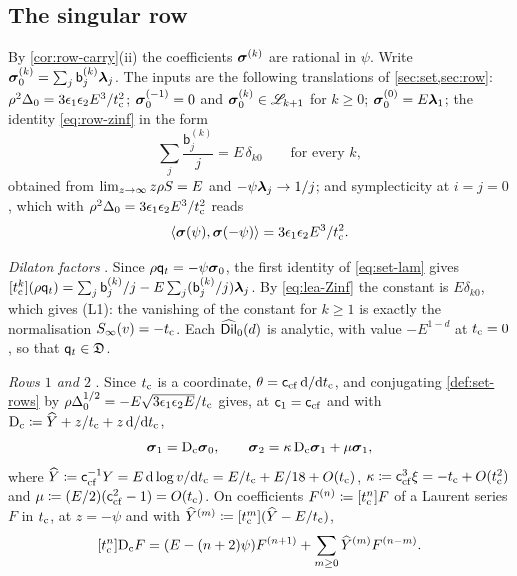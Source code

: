\subsection{The singular row}\label{sec:lea-row0}

By \cref{cor:row-carry}\textup{(ii)} the coefficients $\boldsymbol{\sigma}^{(k)}$ are rational in $\psi$. Write $\boldsymbol{\sigma}_0^{(k)}=\sum_j\mathsf{b}_j^{(k)}\boldsymbol{\lambda}_j$. The inputs are the following translations of \cref{sec:set,sec:row}: $\rho^2\Delta_0=3\epsilon_1\epsilon_2E^3/t_{\mathrm{c}}^2$; $\boldsymbol{\sigma}_0^{(-1)}=0$ and $\boldsymbol{\sigma}_0^{(k)}\in\mathscr{L}_{k+1}$ for $k\geq0$; $\boldsymbol{\sigma}_0^{(0)}=E\boldsymbol{\lambda}_1$; the identity \eqref{eq:row-zinf} in the form
\begin{equation}\label{eq:lea-Zinf}
\sum_j\frac{\mathsf{b}_j^{(k)}}{j}=E\,\delta_{k0}\qquad\text{for every }k,
\end{equation}
obtained from $\lim_{z\to\infty}z\rho S=E$ and $-\psi\boldsymbol{\lambda}_j\to1/j$; and symplecticity at $i=j=0$, which with $\rho^2\Delta_0=3\epsilon_1\epsilon_2E^3/t_{\mathrm{c}}^2$ reads
\begin{equation}\label{eq:lea-K1}
\langle\boldsymbol{\sigma}(\psi),\boldsymbol{\sigma}(-\psi)\rangle=3\epsilon_1\epsilon_2E^3/t_{\mathrm{c}}^2 .
\end{equation}

\emph{Dilaton factors} . Since $\rho\mathsf{q}_{t}=-\psi\boldsymbol{\sigma}_0$, the first identity of \eqref{eq:set-lam} gives $[t_{\mathrm{c}}^k](\rho\mathsf{q}_{t})=\sum_j\mathsf{b}_j^{(k)}/j-E\sum_j(\mathsf{b}_j^{(k)}/j)\boldsymbol{\lambda}_j$. By \eqref{eq:lea-Zinf} the constant is $E\delta_{k0}$, which gives \textup{(L1)}: the vanishing of the constant for $k\geq1$ is exactly the normalisation $S_{\infty}(v)=-t_{\mathrm{c}}$. Each $\widehat{\mathsf{Dil}}_0(d)$ is analytic, with value $-E^{1-d}$ at $t_{\mathrm{c}}=0$, so that $\mathsf{q}_{t}\in\mathfrak{D}$.

\emph{Rows $1$ and $2$} . Since $t_{\mathrm{c}}$ is a coordinate, $\theta=\mathsf{c}_{\mathrm{cf}}\,\mathrm{d}/\mathrm{d}t_{\mathrm{c}}$, and conjugating \cref{def:set-rows} by $\rho\Delta_0^{1/2}=-E\sqrt{3\epsilon_1\epsilon_2E}/t_{\mathrm{c}}$ gives, at $\mathsf{c}_{1}=\mathsf{c}_{\mathrm{cf}}$ and with $\mathrm{D}_{\mathrm{c}}\coloneqq\widehat{Y}+z/t_{\mathrm{c}}+z\,\mathrm{d}/\mathrm{d}t_{\mathrm{c}}$,
\[
\boldsymbol{\sigma}_1=\mathrm{D}_{\mathrm{c}}\boldsymbol{\sigma}_0,\qquad \boldsymbol{\sigma}_2=\kappa\,\mathrm{D}_{\mathrm{c}}\boldsymbol{\sigma}_1+\mu\boldsymbol{\sigma}_1,
\]
where $\widehat{Y}\coloneqq\mathsf{c}_{\mathrm{cf}}^{-1}Y=E\,\mathrm{d}\log v/\mathrm{d}t_{\mathrm{c}}=E/t_{\mathrm{c}}+E/18+O(t_{\mathrm{c}})$, $\kappa\coloneqq\mathsf{c}_{\mathrm{cf}}^3\xi=-t_{\mathrm{c}}+O(t_{\mathrm{c}}^2)$ and $\mu\coloneqq(E/2)(\mathsf{c}_{\mathrm{cf}}^2-1)=O(t_{\mathrm{c}})$. On coefficients $F^{(n)}\coloneqq[t_{\mathrm{c}}^n]F$ of a Laurent series $F$ in $t_{\mathrm{c}}$, at $z=-\psi$ and with $\widehat{Y}^{(m)}\coloneqq[t_{\mathrm{c}}^m](\widehat{Y}-E/t_{\mathrm{c}})$,
\begin{equation}\label{eq:lea-Dc}
[t_{\mathrm{c}}^n]\mathrm{D}_{\mathrm{c}}F=(E-(n+2)\psi)F^{(n+1)}+\sum_{m\ge0}\widehat{Y}^{(m)}F^{(n-m)}.
\end{equation}


